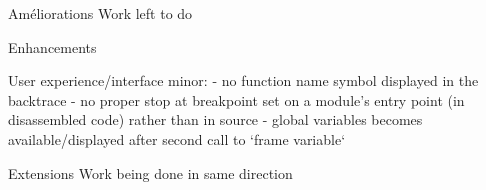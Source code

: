 Améliorations
Work left to do

Enhancements

User experience/interface minor:
- no function name symbol displayed in the backtrace
- no proper stop at breakpoint set on a module's entry point (in disassembled code) rather than in source
- global variables becomes available/displayed after second call to `frame variable`


Extensions
Work being done in same direction
